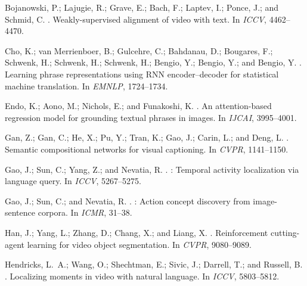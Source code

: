 \documentclass[letterpaper]{article} %
\begin{document}
\begin{thebibliography}{}

Bojanowski, P.; Lajugie, R.; Grave, E.; Bach, F.; Laptev, I.; Ponce, J.; and
  Schmid, C.
.
\newblock Weakly-supervised alignment of video with text.
\newblock In {\em ICCV},  4462--4470.

{Cho}, K.; van {Merrienboer}, B.; {Gulcehre}, C.; {Bahdanau}, D.; {Bougares},
  F.; {Schwenk}, H.; {Schwenk}, H.; {Schwenk}, H.; {Bengio}, Y.; {Bengio}, Y.;
  and {Bengio}, Y.
.
\newblock Learning phrase representations using {RNN} encoder--decoder for
  statistical machine translation.
\newblock In {\em EMNLP},  1724--1734.

Endo, K.; Aono, M.; Nichols, E.; and Funakoshi, K.
.
\newblock An attention-based regression model for grounding textual phrases in
  images.
\newblock In {\em IJCAI},  3995--4001.

Gan, Z.; Gan, C.; He, X.; Pu, Y.; Tran, K.; Gao, J.; Carin, L.; and Deng, L.
.
\newblock Semantic compositional networks for visual captioning.
\newblock In {\em CVPR},  1141--1150.

Gao, J.; Sun, C.; Yang, Z.; and Nevatia, R.
.
: Temporal activity localization via language query.
\newblock In {\em ICCV},  5267--5275.

Gao, J.; Sun, C.; and Nevatia, R.
.
: Action concept discovery from image-sentence corpora.
\newblock In {\em ICMR},  31--38.

Han, J.; Yang, L.; Zhang, D.; Chang, X.; and Liang, X.
.
\newblock Reinforcement cutting-agent learning for video object segmentation.
\newblock In {\em CVPR},  9080--9089.

Hendricks, L.~A.; Wang, O.; Shechtman, E.; Sivic, J.; Darrell, T.; and Russell,
  B.
.
\newblock Localizing moments in video with natural language.
\newblock In {\em ICCV},  5803--5812.


\end{thebibliography}
\end{document}
